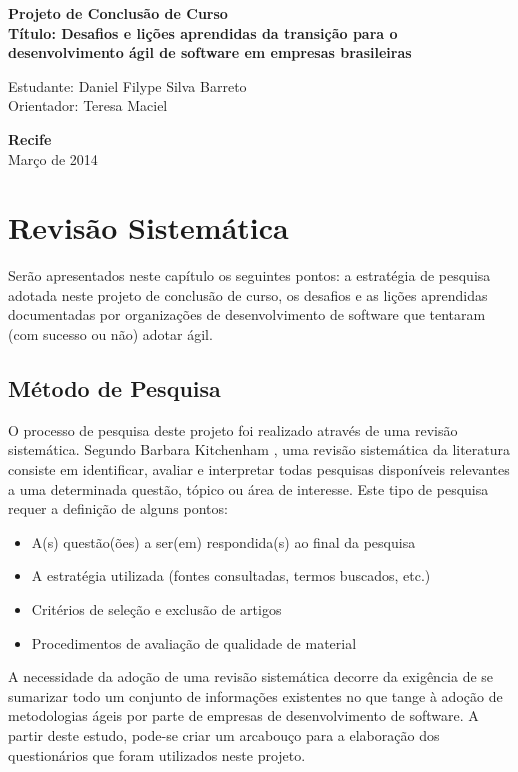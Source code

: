 \documentclass[a4paper,11pt]{article}
\begin{document}
\begin{center}
{\Large \bf  Projeto de Conclusão de Curso}\\[1cm]
{\Large \bf Título: Desafios e lições aprendidas da transição para o desenvolvimento ágil de software em empresas brasileiras} \\[3cm]
\end{center}
{\Large  Estudante: Daniel Filype Silva Barreto}\\[6mm]
{\Large  Orientador: Teresa Maciel}\\[6mm]
\vspace{3.0cm}
\begin{center}
{\large {\bf Recife}\\[6mm]
Março de 2014}
\end{center}
\newpage
\pagestyle {plain}
\setcounter{page}{0} 

\section{Revisão Sistemática}
	Serão apresentados neste capítulo os seguintes pontos: a estratégia de pesquisa adotada neste projeto de conclusão de curso, os desafios e as lições aprendidas documentadas por organizações de desenvolvimento de software que tentaram (com sucesso ou não) adotar ágil.
	\subsection{Método de Pesquisa}
		O processo de pesquisa deste projeto foi realizado através de  uma revisão sistemática. Segundo Barbara Kitchenham \cite{Barbara04}, uma revisão sistemática da literatura consiste em identificar, avaliar e interpretar todas pesquisas disponíveis relevantes a uma determinada questão, tópico ou área de interesse. Este tipo de pesquisa requer a definição de alguns pontos:
		\begin{itemize}
			\item A(s) questão(ões) a ser(em) respondida(s) ao final da pesquisa
			\item A estratégia utilizada (fontes consultadas, termos buscados, etc.)
			\item Critérios de seleção e exclusão de artigos
			\item Procedimentos de avaliação de qualidade de material
		\end{itemize}
		A necessidade da adoção de uma revisão sistemática decorre da exigência de se sumarizar todo um conjunto de informações existentes no que tange à adoção de metodologias ágeis por parte de empresas de desenvolvimento de software. A partir deste estudo, pode-se criar um arcabouço para a elaboração dos questionários que foram utilizados neste projeto.
\end{document}
